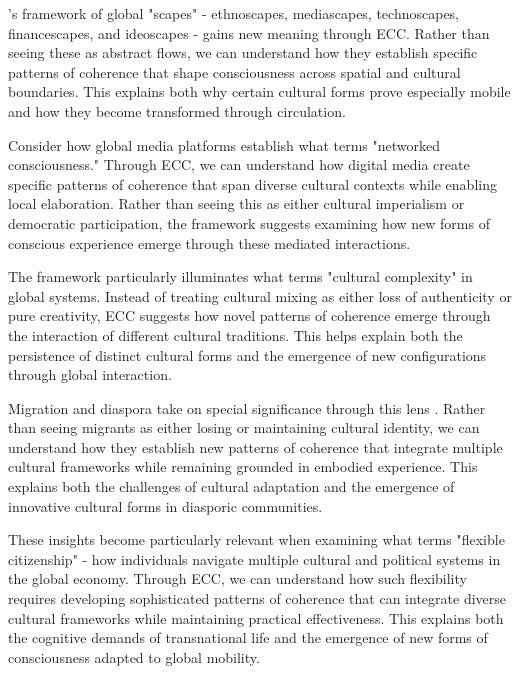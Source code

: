 \begin{refsection}
\cite{appadurai1996modernity}'s framework of global "scapes" - ethnoscapes, mediascapes, technoscapes, financescapes, and ideoscapes - gains new meaning through ECC. Rather than seeing these as abstract flows, we can understand how they establish specific patterns of coherence that shape consciousness across spatial and cultural boundaries. This explains both why certain cultural forms prove especially mobile and how they become transformed through circulation.

Consider how global media platforms establish what \cite{castells2010rise} terms "networked consciousness." Through ECC, we can understand how digital media create specific patterns of coherence that span diverse cultural contexts while enabling local elaboration. Rather than seeing this as either cultural imperialism or democratic participation, the framework suggests examining how new forms of conscious experience emerge through these mediated interactions.

The framework particularly illuminates what \cite{hannerz1996transnational} terms "cultural complexity" in global systems. Instead of treating cultural mixing as either loss of authenticity or pure creativity, ECC suggests how novel patterns of coherence emerge through the interaction of different cultural traditions. This helps explain both the persistence of distinct cultural forms and the emergence of new configurations through global interaction.

Migration and diaspora take on special significance through this lens \cite{schiller1992transnational}. Rather than seeing migrants as either losing or maintaining cultural identity, we can understand how they establish new patterns of coherence that integrate multiple cultural frameworks while remaining grounded in embodied experience. This explains both the challenges of cultural adaptation and the emergence of innovative cultural forms in diasporic communities.

These insights become particularly relevant when examining what \cite{ong1999flexible} terms "flexible citizenship" - how individuals navigate multiple cultural and political systems in the global economy. Through ECC, we can understand how such flexibility requires developing sophisticated patterns of coherence that can integrate diverse cultural frameworks while maintaining practical effectiveness. This explains both the cognitive demands of transnational life and the emergence of new forms of consciousness adapted to global mobility.


\end{refsection}
